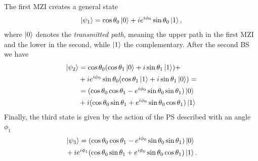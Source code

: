 \documentclass[letterpaper,onecolumn,12pt,accepted=2024-01-17]{article}
\begin{document}
\noindent The first MZI creates a general state 
\begin{align}
    \ket{\psi_1}=  \cos\theta_0 \ket{0} + ie^{i\phi_0}\sin\theta_0\ket{1},
\end{align}
where $\ket{0}$ denotes the \textit{transmitted path}, meaning the upper path in the first MZI and the lower in the second, while $\ket{1}$ the complementary. After the second BS we have
\begin{align}
    \ket{\psi_2} &= \cos\theta_0(\cos\theta_1\ket{0}\nonumber+i\sin\theta_1\ket{1}) +\nonumber\\ &+ie^{i\phi_0}\sin\theta_0(\cos\theta_1\ket{1}\nonumber+i\sin\theta_1\ket{0}) = \nonumber\\
    &= (\cos\theta_0\cos\theta_1-e^{i\phi_0}\sin\theta_0\sin\theta_1)\ket{0}\nonumber\\
    &+i(\cos\theta_0\sin\theta_1+e^{i\phi_0}\sin\theta_0\cos\theta_1)\ket{1}
    \end{align}
Finally, the third state is given by the action of the PS described with an angle $\phi_1$
\begin{align}
    &\ket{\psi_3}=(\cos\theta_0\cos\theta_1-e^{i\phi_0}\sin\theta_0\sin\theta_1)\ket{0}\nonumber\\
    &+ie^{i\phi_1}(\cos\theta_0\sin\theta_1+e^{i\phi_0}\sin\theta_0\cos\theta_1)\ket{1}.
\end{align}
\end{document}
